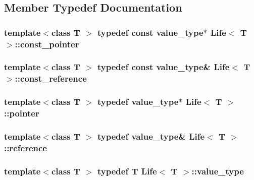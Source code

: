 \subsection{Member Typedef Documentation}
\hypertarget{classLife_a8e7afcee10dfa80f7a8826be61e79eca}{
\subsubsection[{const\-\_\-pointer}]{\setlength{\rightskip}{0pt plus 5cm}template$<$class T $>$ typedef const {\bf value\-\_\-type}$\ast$ {\bf Life}$<$ T $>$\-::{\bf const\-\_\-pointer}}}\label{classLife_a8e7afcee10dfa80f7a8826be61e79eca}
\hypertarget{classLife_a2cafb762c1d8dc3d3fc2c820f175b847}{
\subsubsection[{const\-\_\-reference}]{\setlength{\rightskip}{0pt plus 5cm}template$<$class T $>$ typedef const {\bf value\-\_\-type}\& {\bf Life}$<$ T $>$\-::{\bf const\-\_\-reference}}}\label{classLife_a2cafb762c1d8dc3d3fc2c820f175b847}
\hypertarget{classLife_a9fcacd1ed4c7c6c313f94fd4e8437c20}{
\subsubsection[{pointer}]{\setlength{\rightskip}{0pt plus 5cm}template$<$class T $>$ typedef {\bf value\-\_\-type}$\ast$ {\bf Life}$<$ T $>$\-::{\bf pointer}}}\label{classLife_a9fcacd1ed4c7c6c313f94fd4e8437c20}
\hypertarget{classLife_ab4d947634b5fb6d355a4a10cd6b0c505}{
\subsubsection[{reference}]{\setlength{\rightskip}{0pt plus 5cm}template$<$class T $>$ typedef {\bf value\-\_\-type}\& {\bf Life}$<$ T $>$\-::{\bf reference}}}\label{classLife_ab4d947634b5fb6d355a4a10cd6b0c505}
\hypertarget{classLife_aa51e5c8b3a0acdfa99fc9ea8c2b550f8}{
\subsubsection[{value\-\_\-type}]{\setlength{\rightskip}{0pt plus 5cm}template$<$class T $>$ typedef T {\bf Life}$<$ T $>$\-::{\bf value\-\_\-type}}}\label{classLife_aa51e5c8b3a0acdfa99fc9ea8c2b550f8}



